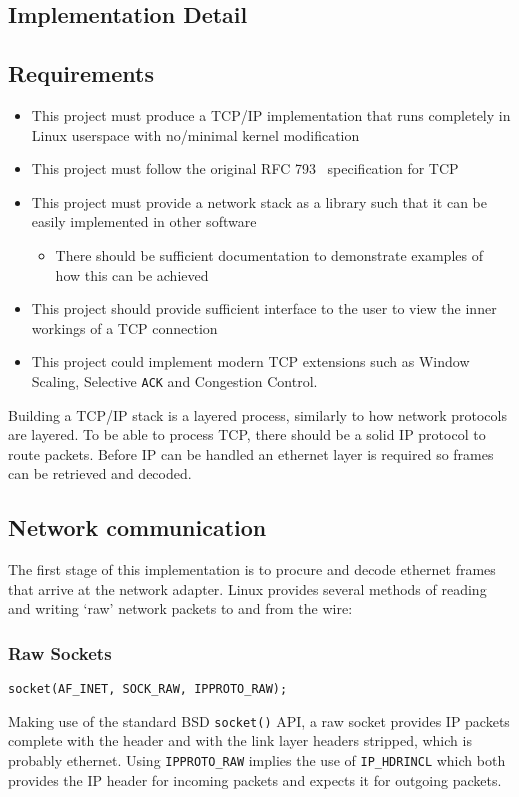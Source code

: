 \documentclass[11pt,a4paper,british]{bhamarticle}
\begin{document}
\begin{multicols}{2}
\section{Implementation Detail}


\subsection{Requirements}
\begin{itemize}
    \item This project must produce a TCP/IP implementation that runs completely in Linux userspace with no/minimal kernel modification
    \item This project must follow the original RFC 793~\cite{rfc793} specification for TCP
    \item This project must provide a network stack as a library such that it can be easily implemented in other software
        \begin{itemize}
            \item There should be sufficient documentation to demonstrate examples of how this can be achieved
        \end{itemize}
    \item This project should provide sufficient interface to the user to view the inner workings of a TCP connection
    \item This project could implement modern TCP extensions such as Window Scaling, Selective \texttt{ACK} and Congestion Control.
\end{itemize}

Building a TCP/IP stack is a layered process, similarly to how network protocols are layered. To be able to process TCP, there should be a solid IP protocol to route packets. Before IP can be handled an ethernet layer is required so frames can be retrieved and decoded.

\subsection{Network communication}\label{sec:netcomms}
The first stage of this implementation is to procure and decode ethernet frames that arrive at the network adapter. Linux provides several methods of reading and writing `raw' network packets to and from the wire:
\subsubsection{Raw Sockets}
\begin{Verbatim}[fontsize=\small]
socket(AF_INET, SOCK_RAW, IPPROTO_RAW);
\end{Verbatim}
Making use of the standard BSD \texttt{socket()} API, a raw socket provides IP packets complete with the header and with the link layer headers stripped, which is probably ethernet. Using \texttt{IPPROTO\_RAW} implies the use of \texttt{IP\_HDRINCL} which both provides the IP header for incoming packets and expects it for outgoing packets.


\end{multicols}
\end{document}
